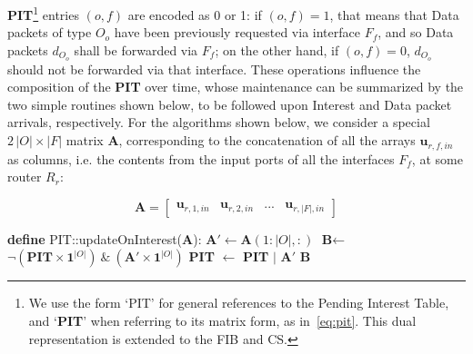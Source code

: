 \textbf{PIT}\footnote{We use the form `PIT' for general references to the Pending 
Interest Table, and `\textbf{PIT}' when referring to its matrix form, as in~\ref{eq:pit}. 
This dual representation is extended to the FIB and CS.} entries 
$(o,f)$ are encoded as 0 or 1: if $(o,f) = 1$, that means that Data 
packets of 
type $O_o$ have been previously requested via interface $F_f$, and so Data 
packets $d_{O_o}$ shall be forwarded via $F_f$; on the other hand, 
if $(o,f) = 0$, $d_{O_o}$ should not be forwarded via that 
interface. These operations influence the composition of the \textbf{PIT} over time, whose 
maintenance can be summarized by the two simple routines shown below, to be 
followed upon Interest and Data packet arrivals, respectively. For the algorithms shown 
below, we consider a special $2\,|O| \times |F|$ matrix \textbf{A}, corresponding to the concatenation of 
all the arrays $\textbf{u}_{r,f,in}$ as columns, i.e. the contents from the input ports 
of all the interfaces $F_f$, at some router $R_r$:

\begin{equation}
\textbf{A} = \begin{bmatrix} \textbf{u}_{r,1,in} & \textbf{u}_{r,2,in} & ... & \textbf{u}_{r,|F|,in} \end{bmatrix}
    \label{eq:a}
\end{equation}\shortvertbreak

\begin{algorithmic}[1]

\State \textbf{define} PIT::updateOnInterest(\textbf{A}):
\State
    \State $\textbf{A}' \leftarrow \textbf{A}(1:|O|,:)$
    \State $\textbf{B} \leftarrow$ $\neg(\textbf{PIT} \times \textbf{1}^{|O|}) \ \& \ (\textbf{A}' \times \textbf{1}^{|O|})$
    \State \textbf{PIT} $\leftarrow$ \textbf{PIT} $|$ $\textbf{A}'$ 
    \State \Return $\textbf{B}$

\end{algorithmic}\shortvertbreak

